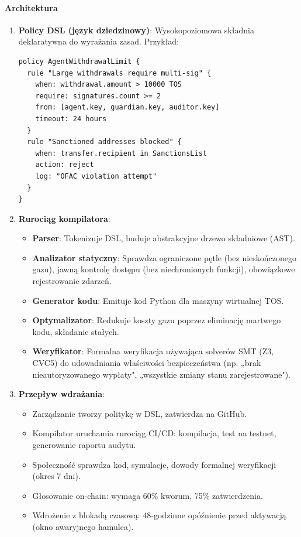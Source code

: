 \documentclass[11pt]{article}
\begin{document}
\paragraph{Architektura}
\begin{enumerate}[noitemsep]
  \item \textbf{Policy DSL (język dziedzinowy)}: Wysokopoziomowa składnia deklaratywna do wyrażania zasad. Przykład:
  \begin{verbatim}
policy AgentWithdrawalLimit {
  rule "Large withdrawals require multi-sig" {
    when: withdrawal.amount > 10000 TOS
    require: signatures.count >= 2
    from: [agent.key, guardian.key, auditor.key]
    timeout: 24 hours
  }
  rule "Sanctioned addresses blocked" {
    when: transfer.recipient in SanctionsList
    action: reject
    log: "OFAC violation attempt"
  }
}
  \end{verbatim}
  \item \textbf{Rurociąg kompilatora}:
    \begin{itemize}[noitemsep]
      \item \textbf{Parser}: Tokenizuje DSL, buduje abstrakcyjne drzewo składniowe (AST).
      \item \textbf{Analizator statyczny}: Sprawdza ograniczone pętle (bez nieskończonego gazu), jawną kontrolę dostępu (bez niechronionych funkcji), obowiązkowe rejestrowanie zdarzeń.
      \item \textbf{Generator kodu}: Emituje kod Python dla maszyny wirtualnej TOS.
      \item \textbf{Optymalizator}: Redukuje koszty gazu poprzez eliminację martwego kodu, składanie stałych.
      \item \textbf{Weryfikator}: Formalna weryfikacja używająca solverów SMT (Z3, CVC5) do udowadniania właściwości bezpieczeństwa (np. „brak nieautoryzowanego wypłaty", „wszystkie zmiany stanu zarejestrowane").
    \end{itemize}
  \item \textbf{Przepływ wdrażania}:
    \begin{itemize}[noitemsep]
      \item Zarządzanie tworzy politykę w DSL, zatwierdza na GitHub.
      \item Kompilator uruchamia rurociąg CI/CD: kompilacja, test na testnet, generowanie raportu audytu.
      \item Społeczność sprawdza kod, symulacje, dowody formalnej weryfikacji (okres 7 dni).
      \item Głosowanie on-chain: wymaga 60\% kworum, 75\% zatwierdzenia.
      \item Wdrożenie z blokadą czasową: 48-godzinne opóźnienie przed aktywacją (okno awaryjnego hamulca).
    \end{itemize}
\end{enumerate}
\end{document}

